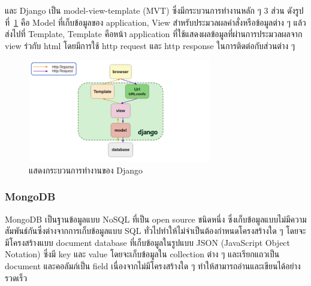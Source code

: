 \documentclass[12pt,oneside,openright,a4paper]{cpe-thai-project}
\begin{document}
\par\setlength{\parindent}{5ex}
และ Django เป็น model-view-template (MVT) ซึ่งมีกระบวนการทำงานหลัก ๆ 3 ส่วน ดังรูปที่~\ref{fig:django2} คือ Model ที่เก็บข้อมูลของ application, View สำหรับประมวลผลคำสั่งหรือข้อมูลต่าง ๆ แล้วส่งไปที่ Template, Template คือหน้า application ที่ใช้แสดงผลข้อมูลที่ผ่านการประมวลผลจาก view ร่วกับ html โดยมีการใช้ http request และ http response ในการติดต่อกับส่วนต่าง ๆ 

\begin{figure}[!h]
  \centering
  \includegraphics[width=8cm]{./image/django2.png}
  \caption{แสดงกระบวนการทำงานของ Django}
  \label{fig:django2}
\end{figure}


\subsubsection{MongoDB}
\par\setlength{\parindent}{5ex}
MongoDB เป็นฐานข้อมูลแบบ NoSQL ที่เป็น open source ชนิดหนึ่ง ซึ่งเก็บข้อมูลแบบไม่มีความสัมพันธ์กันซึ่งต่างจากการเก็บข้อมูลแบบ SQL ทั่วไปทำให้ไม่จำเป็นต้องกำหนดโครงสร้างใด ๆ โดยจะมีโครงสร้างแบบ document database ที่เก็บข้อมูลในรูปแบบ JSON (JavaScript Object Notation) ซึ่งมี key และ value โดยจะเก็บข้อมูลใน collection ต่าง ๆ และเรียกแถวเป็น document และคอลัมภ์เป็น field เนื่องจากไม่มีโครงสร้างใด ๆ ทำให้สามารถอ่านและเขียนได้อย่างรวดเร็ว
\end{document}
